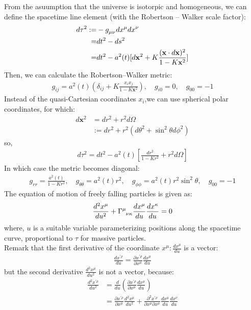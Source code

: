 \documentclass[11pt]{ltjsarticle}
\theoremstyle{plain}
\theoremstyle{break}
\newcommand{\mbfx}{\mathbf{x}}
\newcommand{\tensorGamma}[1]{\tensor{\Gamma}{ #1}}
\newcommand{\tensorg}[1]{\tensor{g}{ #1}}
\def\odi#1#2{\frac{d #1}{d #2}} %
\def\todi#1#2{\frac{d^{2} #1}{d #2^{2}}} %
\newcommand{\pdi}[2]{\frac{\partial #1}{\partial #2}}%
\begin{document}
From the asuumption that the universe is isotorpic and homogeneous,
we can define the spacetime line element
(with the Robertson – Walker scale factor):
\begin{align}
  d\tau^2
  :=& - \tensorg{_{\mu\nu}}dx^\mu dx^\nu \\
  =& dt^2 - ds^2 \\
  =& dt^2 - a^2(t) [d\mbfx^2 + K\frac{(\mbfx\cdot d\mbfx)^2}{1-K\mbfx^2}]
\end{align}
Then, we can calculate the Robertson–Walker metric:
\begin{align}
  g_{ij} = a^2(t)(\delta_{ij} + K\frac{x_i x_j}{1-K\mbfx^2}),\quad g_{i0}=0,\quad g_{00} = -1
\end{align}
Instead of the quasi-Cartesian coordinates $x_i$,we can use spherical polar coordinates, for which:
\begin{align}
  d\mbfx^2
  &= dr^2 + r^2 d\Omega\\
  &:= dr^2 + r^2(d\theta^2 + \sin^2\theta d\phi^2)
\end{align}
so,
\begin{align}
  d\tau^2 = dt^2 - a^2(t)[\frac{dr^2}{1-Kr^2} + r^2 d\Omega]
\end{align}
In which case the metric becomes diagonal:
\begin{align}
  g_{rr} = \frac{a^2(t)}{1-Kr^2},\quad g_{\theta\theta}= a^2(t)r^2,\quad g_{\phi\phi}= a^2(t)r^2 \sin^2\theta, \quad g_{00} = -1
\end{align}
The equation of motion of freely falling particles is given as:
\begin{align}
  \frac{d^2 x^\mu}{du^2} + \tensorGamma{^\mu_{\nu\kappa}} \frac{dx^\mu}{du}\frac{dx^\kappa}{du} = 0
  \label{eq:geodesic-equation}
\end{align}
where, $u$ is  a suitable variable parameterizing positions along the spacetime curve, proportional to $\tau$ for massive particles. \\%
Remark that the first derivative of the coordinate $x^\mu :\frac{dx^\mu}{du}$ is a vector:
\begin{align}
  \frac{dx^{\prime \rho}}{du} = \frac{\partial x^{\prime \rho}}{\partial x^\mu}\frac{dx^\mu}{du}
\end{align}
but the second derivative $\todi{x^\mu}{u}$  is not a vector, because:
\begin{align}
  \todi{x^{\prime \rho}}{u}
  &= \frac{d}{du}(\pdi{x^{\prime \rho}}{x^\mu} \odi{x^\mu}{u})\\
  &= \pdi{x^{\prime \rho}}{x^\mu} \todi{x^\mu}{u} + \frac{\partial^2 x^{\prime \rho}}{\partial x^\mu \partial x^\mu} \frac{d x^\mu}{du}\frac{dx^\nu}{du}
\end{align}
\end{document}

